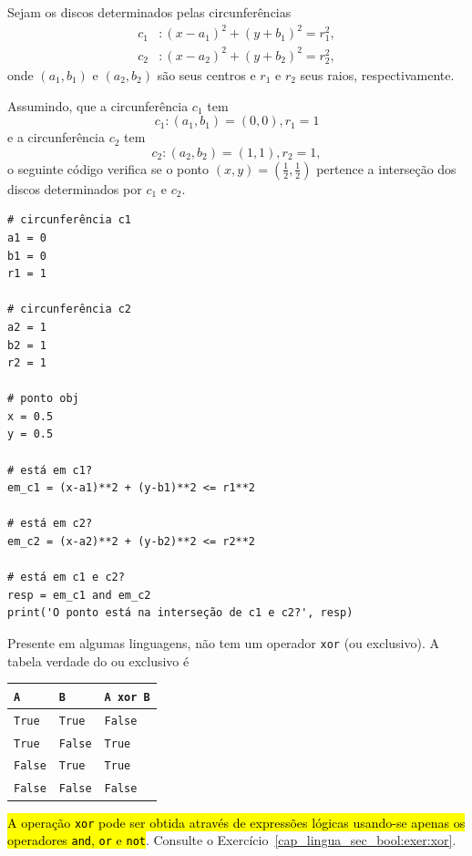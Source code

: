 \begin{ex}
  Sejam os discos determinados pelas circunferências
  \begin{align}
    c_1&: (x - a_1)^2 + (y + b_1)^2 = r_1^2,\\
    c_2&: (x - a_2)^2 + (y + b_2)^2 = r_2^2,
  \end{align}
  onde $(a_1, b_1)$ e $(a_2, b_2)$ são seus centros e $r_1$ e $r_2$ seus raios, respectivamente.

  Assumindo, que a circunferência $c_1$ tem
  \begin{equation}
    c_1: (a_1, b_1) = (0, 0), r_1 = 1
  \end{equation}
  e a circunferência $c_2$ tem
  \begin{equation}
    c_2: (a_2, b_2) = (1, 1), r_2 = 1,
  \end{equation}
  o seguinte código verifica se o ponto $(x, y) = \left(\frac{1}{2}, \frac{1}{2}\right)$ pertence a interseção dos discos determinados por $c_1$ e $c_2$.

\begin{lstlisting}
# circunferência c1
a1 = 0
b1 = 0
r1 = 1

# circunferência c2
a2 = 1
b2 = 1
r2 = 1

# ponto obj
x = 0.5
y = 0.5

# está em c1?
em_c1 = (x-a1)**2 + (y-b1)**2 <= r1**2

# está em c2?
em_c2 = (x-a2)**2 + (y-b2)**2 <= r2**2

# está em c1 e c2?
resp = em_c1 and em_c2
print('O ponto está na interseção de c1 e c2?', resp)
\end{lstlisting}
\end{ex}

\ifisbook
\vspace{0.5cm}
\fi

\begin{obs}\label{cap_lingua_sec_bool:obs:xor}
  Presente em algumas linguagens, {\python} não tem um operador \lstinline+xor+ (ou exclusivo). A tabela verdade do ou exclusivo é
  \begin{center}
    \begin{tabular}[H]{ll|l}
      {\lstinline+A+}     & {\lstinline+B+}     & {\lstinline+A xor B+} \\\hline
      {\lstinline+True+}  & {\lstinline+True+}  & {\lstinline+False+}   \\
      {\lstinline+True+}  & {\lstinline+False+} & {\lstinline+True+}    \\
      {\lstinline+False+} & {\lstinline+True+}  & {\lstinline+True+}    \\
      {\lstinline+False+} & {\lstinline+False+} & {\lstinline+False+}   \\\hline    
    \end{tabular}
  \end{center}
  \hl{A operação \texttt{xor} pode ser obtida através de expressões lógicas usando-se apenas os operadores \texttt{and}, \texttt{or} e \texttt{not}}. Consulte o Exercício~\ref{cap_lingua_sec_bool:exer:xor}.
\end{obs}

